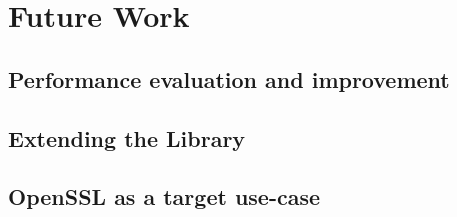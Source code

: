\chapter{Future Work}



\section{Performance evaluation and improvement}

\section{Extending the Library}

\section{OpenSSL as a target use-case}